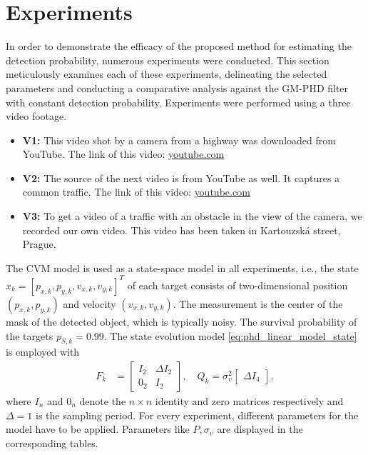 \chapter{Experiments}
\label{sec:experiments}
In order to demonstrate the efficacy of the proposed method for estimating the detection probability, numerous experiments were conducted. This section meticulously exa\-mines each of these experiments, delineating the selected parameters and conducting a comparative analysis against the GM-PHD filter with constant detection probability.
Experiments were performed using a three video footage.
\begin{itemize}
  \item \textbf{V1:} This video shot by a camera from a highway was downloaded from YouTube. The link of this video: \href{https://www.youtube.com/watch?v=KBsqQez-O4w&t=30s&ab_channel=NickMartinez}{youtube.com}
  \item \textbf{V2:} The source of the next video is from YouTube as well. It captures a common traffic. The link of this
  video: \href{https://www.youtube.com/watch?v=7WFYiZersNc&ab_channel=AbdulMunaim}{youtube.com}
  \item \textbf{V3:} To get a video of a traffic with an obstacle in the view of the camera, we recorded our own video. This video has been taken in Kartouzská street, Prague.
\end{itemize}
 The CVM model is used as a state-space model in all experiments, i.e., the state $x_k = [p_{x
,k},
p_{y
,k},v_{x
,k},v_{y,
k}]^T$ of each target consists of two-dimensional position $(p_{x,k},p_{y,k})$ and velocity $(v_{x,k},v_{y,k})$. The measurement is the center of the mask of the detected object, which is typically noisy. The survival probability of the targets $p_{S,k} = 0.99$. The state evolution model \eqref{eq:phd_linear_model_state} is employed with
\begin{align}
  F_k &=
  \begin{bmatrix}
    I_2 & \Delta I_2 \\
    0_2 & I_2
  \end{bmatrix},
  \quad
  Q_k = \sigma_{\upsilon}^2
  \begin{bmatrix}
    \Delta I_4
  \end{bmatrix},
\end{align}
where $I_n$ and $0_n$ denote the $n\times n$ identity and zero matrices respectively and $\Delta = 1$ is the sampling
period. For every experiment, different parameters for the model have to be applied. Parameters like $P, \sigma_{\upsilon}$
are displayed in the corresponding tables.

